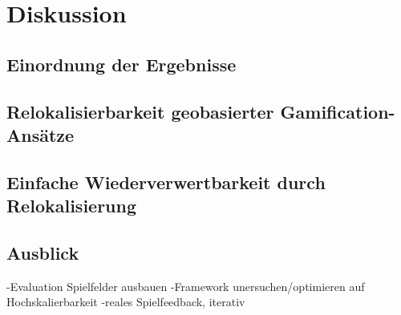 \chapter{Diskussion}
\label{sec:S7_Diskussion}

\section{Einordnung der Ergebnisse}

\section{Relokalisierbarkeit geobasierter Gamification-Ansätze}

\section{Einfache Wiederverwertbarkeit durch Relokalisierung}

\section{Ausblick}

-Evaluation Spielfelder ausbauen
-Framework unersuchen/optimieren auf Hochskalierbarkeit
-reales Spielfeedback, iterativ